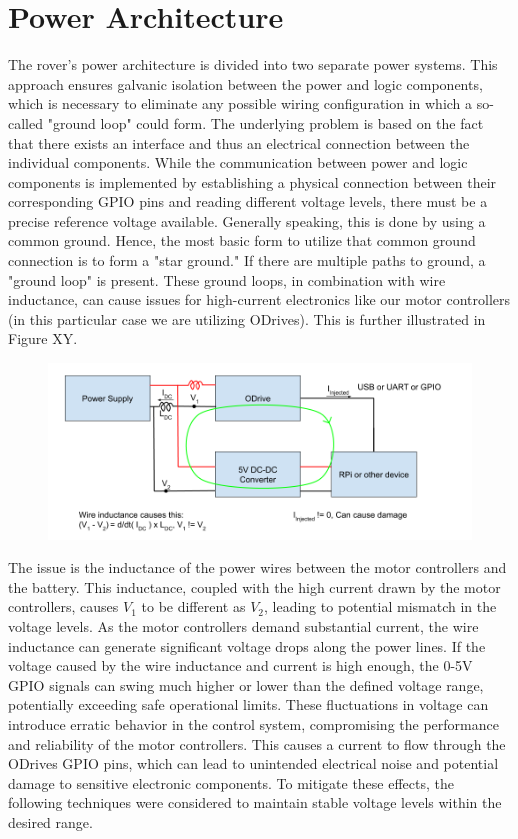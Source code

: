\newpage



\newpage
\section{Power Architecture}


The rover's power architecture is divided into two separate power systems. This approach ensures galvanic isolation between the power and logic components, which is necessary to eliminate any possible wiring configuration in which a so-called "ground loop" could form. The underlying problem is based on the fact that there exists an interface and thus an electrical connection between the individual components. While the communication between power and logic components is implemented by establishing a physical connection between their corresponding GPIO pins and reading different voltage levels, there must be a precise reference voltage available. Generally speaking, this is done by using a common ground. Hence, the most basic form to utilize that common ground connection is to form a "star ground." If there are multiple paths to ground, a "ground loop" is present. These ground loops, in combination with wire inductance, can cause issues for high-current electronics like our motor controllers (in this particular case we are utilizing ODrives). This is further illustrated in Figure XY.

\begin{figure}[h]
\includegraphics[width=\textwidth]{contents/figures/ground_loop_bad.png}
\end{figure}

The issue is the inductance of the power wires between the motor controllers and the battery. This inductance, coupled with the high current drawn by the motor controllers, causes $V_1$ to be different as $V_2$, leading to potential mismatch in the voltage levels. As the motor controllers demand substantial current, the wire inductance can generate significant voltage drops along the power lines. If the voltage caused by the wire inductance and current is high enough, the 0-5V GPIO signals can swing much higher or lower than the defined voltage range, potentially exceeding safe operational limits. These fluctuations in voltage can introduce erratic behavior in the control system, compromising the performance and reliability of the motor controllers. This causes a current to flow through the ODrives GPIO pins, which can lead to unintended electrical noise and potential damage to sensitive electronic components. To mitigate these effects, the following techniques were considered to maintain stable voltage levels within the desired range.

